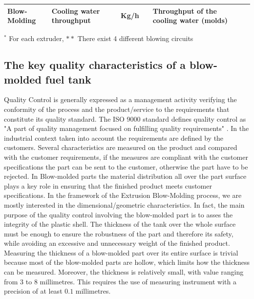 \begin{landscape}
\begin{table}[]
\begin{tabular}{|l|l|l|l|l|l|}
Blow-Molding & Cooling water throughput     & Kg/h                              &               & Throughput of the cooling water (molds)                                               &              \\ \hline
\end{tabular}
\end{table}
\footnotesize{$^*$ For each extruder, $**$ There exist 4 different blowing circuits}\\
\end{landscape}


\subsection{The key quality characteristics of a blow-molded fuel tank} \label{The key quality characteristics of a blow-molded fuel tank}

Quality Control is generally expressed as a management activity verifying the conformity of the process and the product/service to the requirements that constitute its quality standard. The ISO 9000 standard defines quality control as "A part of quality management focused on fulfilling quality requirements" \citep{iso9000}. In the industrial context taken into account the requirements are defined by the customers. Several characteristics are measured on the product and compared with the customer requirements, if the measures are compliant with the customer specifications the part can be sent to the customer, otherwise the part have to be rejected. In Blow-molded parts the material distribution all over the part surface plays a key role in ensuring that the finished product meets customer specifications. In the framework of the Extrusion Blow-Molding process, we are mostly interested in the dimensional/geometric characteristics. In fact, the main purpose of the quality control involving the blow-molded part is to asses the integrity of the plastic shell. The thickness of the tank over the whole surface must be enough to ensure the robustness of the part and therefore its safety, while avoiding an excessive and unnecessary weight of the finished product. Measuring the thickness of a blow-molded part over its entire surface is trivial because most of the blow-molded parts are hollow, which limits how the thickness can be measured. Moreover, the thickness is relatively small, with value ranging from $3$ to $8$ millimetres. This requires the use of measuring instrument with a precision of at least $0.1$ millimetres.


